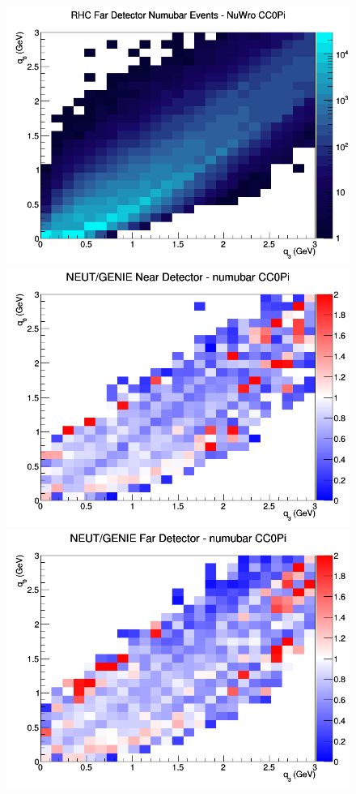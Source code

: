 \documentclass[12pt]{article}
\begin{document}
\begin{figure}[h]
\endminipage
{}
\includegraphics[width=\linewidth]{eff_q0_q3/GAr/CC0Pi_RHC_FD_numubar_q3_q0_NuWro.png}
\endminipage
\newline
{}
\includegraphics[width=\linewidth]{eff_q0_q3/GAr/ratios/CC0Pi_NEUT_GENIE_numubar_near_q3_q0.png}
\endminipage
{}
\includegraphics[width=\linewidth]{eff_q0_q3/GAr/ratios/CC0Pi_NEUT_GENIE_numubar_far_q3_q0.png}

\end{figure}
\end{document}
